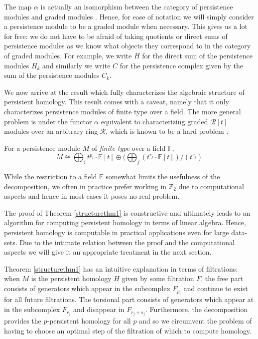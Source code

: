 The map $\alpha$ is actually an isomorphism between the category of persistence modules and graded modules \cite{ghirst}. Hence, for ease of notation we will simply consider a persistence module to be a graded module when necessary. This gives us a lot for free: we do not have to be afraid of taking quotients or direct sums of persistence modules as we know what objects they correspond to in the category of graded modules. For example, we write $H$ for the direct sum of the persistence modules $H_{k}$ and similarly we write $C$ for the persistence complex given by the sum of the persistence modules $C_{k}$.

We now arrive at the result which fully characterizes the algebraic structure of persistent homology. This result comes with a caveat, namely that it only characterizes persistence modules of finite type over a field. The more general problem is under the functor $\alpha$ equivalent to characterizing graded $\mathcal{R}[t]$ modules over an arbitrary ring $\mathcal{R}$, which is known to be a hard problem \cite{ghirst}.
\begin{theorem} \label{structurethm1}
  For a persistence module $M$ of \textit{finite type} over a field $\mathbb{F}$,
  \[M \cong \bigoplus_{i} t^{p_{i}} \cdot \mathbb{F}[t] \oplus (\bigoplus_{j} (t^{r_{j}} \cdot \mathbb{F}[t]) / (t^{s_{j}}) \]

\end{theorem}

While the restriction to a field $\mathbb{F}$ somewhat limits the usefulness of the decomposition, we often in practice prefer working in $\mathbb{Z}_{2}$ due to computational aspects and hence in most cases it poses no real problem.

The proof of Theorem \ref{structurethm1} is constructive and ultimately leads to an algorithm for computing persistent homology in terms of linear algebra. Hence, persistent homology is computable in practical applications even for large data-sets. Due to the intimate relation between the proof and the computational aspects we will give it an appropriate treatment in the next section.

Theorem \ref{structurethm1} has an intuitive explanation in terms of filtrations: when $M$ is the persistent homology $H$ given by some filtration $F$, the free part consists of generators which appear in the subcomplex $F_{p_{i}}$ and continue to exist for all future filtrations. The torsional part consists of generators which appear at in the subcomplex $F_{r_{j}}$ and disappear in  $F_{r_{j}+s_{j}}$. Furthermore, the decomposition provides the $p$-persistent homology for all $p$ and so we circumvent the problem of having to choose an optimal step of the filtration of which to compute homology.

